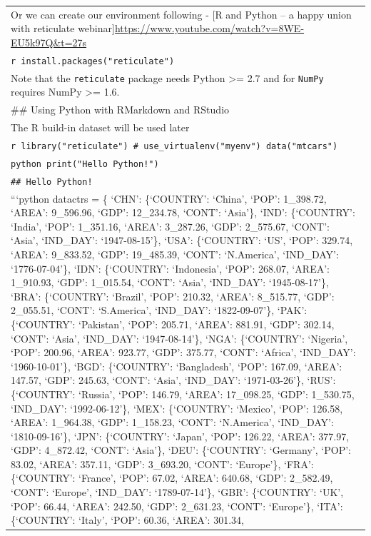 \documentclass[
]{book}
\begin{document}
\begin{longtable}[]{@{}
  >{\raggedleft\arraybackslash}p{}@{}}
Or we can create our environment following - {[}R and Python -- a happy union with reticulate webinar{]}\url{https://www.youtube.com/watch?v=8WE-EU5k97Q\&t=27s} \\
\texttt{r\ install.packages("reticulate")} \\
Note that the \texttt{reticulate} package needs Python \textgreater= 2.7 and for \texttt{NumPy} requires NumPy \textgreater= 1.6. \\
\#\# Using Python with RMarkdown and RStudio \\
The R build-in dataset will be used later \\
\texttt{r\ library("reticulate")\ \#\ use\_virtualenv("myenv")\ data("mtcars")} \\
\texttt{python\ print("Hello\ Python!")} \\
\texttt{\#\#\ Hello\ Python!} \\
```python
datactrs = \{
`CHN': \{`COUNTRY': `China', `POP': 1\_398.72, `AREA': 9\_596.96,
`GDP': 12\_234.78, `CONT': `Asia'\},
`IND': \{`COUNTRY': `India', `POP': 1\_351.16, `AREA': 3\_287.26,
`GDP': 2\_575.67, `CONT': `Asia', `IND\_DAY': `1947-08-15'\},
`USA': \{`COUNTRY': `US', `POP': 329.74, `AREA': 9\_833.52,
`GDP': 19\_485.39, `CONT': `N.America',
`IND\_DAY': `1776-07-04'\},
`IDN': \{`COUNTRY': `Indonesia', `POP': 268.07, `AREA': 1\_910.93,
`GDP': 1\_015.54, `CONT': `Asia', `IND\_DAY': `1945-08-17'\},
`BRA': \{`COUNTRY': `Brazil', `POP': 210.32, `AREA': 8\_515.77,
`GDP': 2\_055.51, `CONT': `S.America', `IND\_DAY': `1822-09-07'\},
`PAK': \{`COUNTRY': `Pakistan', `POP': 205.71, `AREA': 881.91,
`GDP': 302.14, `CONT': `Asia', `IND\_DAY': `1947-08-14'\},
`NGA': \{`COUNTRY': `Nigeria', `POP': 200.96, `AREA': 923.77,
`GDP': 375.77, `CONT': `Africa', `IND\_DAY': `1960-10-01'\},
`BGD': \{`COUNTRY': `Bangladesh', `POP': 167.09, `AREA': 147.57,
`GDP': 245.63, `CONT': `Asia', `IND\_DAY': `1971-03-26'\},
`RUS': \{`COUNTRY': `Russia', `POP': 146.79, `AREA': 17\_098.25,
`GDP': 1\_530.75, `IND\_DAY': `1992-06-12'\},
`MEX': \{`COUNTRY': `Mexico', `POP': 126.58, `AREA': 1\_964.38,
`GDP': 1\_158.23, `CONT': `N.America', `IND\_DAY': `1810-09-16'\},
`JPN': \{`COUNTRY': `Japan', `POP': 126.22, `AREA': 377.97,
`GDP': 4\_872.42, `CONT': `Asia'\},
`DEU': \{`COUNTRY': `Germany', `POP': 83.02, `AREA': 357.11,
`GDP': 3\_693.20, `CONT': `Europe'\},
`FRA': \{`COUNTRY': `France', `POP': 67.02, `AREA': 640.68,
`GDP': 2\_582.49, `CONT': `Europe', `IND\_DAY': `1789-07-14'\},
`GBR': \{`COUNTRY': `UK', `POP': 66.44, `AREA': 242.50,
`GDP': 2\_631.23, `CONT': `Europe'\},
`ITA': \{`COUNTRY': `Italy', `POP': 60.36, `AREA': 301.34,

\end{longtable}
\end{document}

